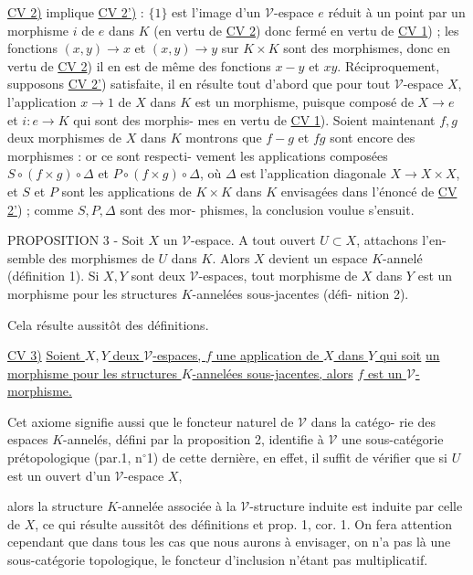 \underline{CV 2)} implique \underline{CV 2')} : $\{1\}$ est l'image d'un $\mathcal{V}$-espace $e$ réduit à
un point par un morphisme $i$ de $e$ dans $K$ (en vertu de \underline{CV 2}) donc fermé en
vertu de \underline{CV 1}) ; les fonctions $(x,y) \to x$ et $(x,y) \to y$ sur $K \times K$ sont des
morphismes, donc en vertu de \underline{CV 2}) il en est de même des fonctions $x-y$ et
$xy$. Réciproquement, supposons \underline{CV 2'}) satisfaite, il en résulte tout
d'abord que pour tout $\mathcal{V}$-espace $X$, l'application $x \to 1$ de $X$ dans $K$ est
un morphisme, puisque composé de $X \to e$ et $i : e \to K$ qui sont des morphis-
mes en vertu de \underline{CV 1}). Soient maintenant $f,g$ deux morphismes de $X$ dans $K$
montrons que $f-g$ et $f g$ sont encore des morphismes : or ce sont respecti-
vement les applications composées $S \circ (f \times g) \circ \Delta$ et $P \circ (f \times g) \circ \Delta$, où $\Delta$ est
l'application diagonale $X \to X \times X$, et $S$ et $P$ sont les applications de $K \times K$
dans $K$ envisagées dans l'énoncé de \underline{CV 2'}) ; comme $S, P, \Delta$ sont des mor-
phismes, la conclusion voulue s'ensuit.

PROPOSITION 3 - Soit $X$ un $\mathcal{V}$-espace. A tout ouvert $U \subset X$, attachons l'en-
semble des morphismes de $U$ dans $K$. Alors $X$ devient un espace $K$-annelé
(définition 1). Si $X,Y$ sont deux $\mathcal{V}$-espaces, tout morphisme de $X$ dans
$Y$ est un morphisme pour les structures $K$-annelées sous-jacentes (défi-
nition 2).

Cela résulte aussitôt des définitions.

\underline{CV 3)} \underline{Soient $X,Y$ deux $\mathcal{V}$-espaces, $f$ une application de $X$ dans $Y$ qui soit}
\underline{un morphisme pour les structures $K$-annelées sous-jacentes, alors}
\underline{$f$ est un $\mathcal{V}$-morphisme.}

Cet axiome signifie aussi que le foncteur naturel de $\mathcal{V}$ dans la catégo-
rie des espaces $K$-annelés, défini par la proposition 2, identifie à $\mathcal{V}$
une sous-catégorie prétopologique (par.1, n$^{\circ}$1) de cette dernière, en
effet, il suffit de vérifier que si $U$ est un ouvert d'un $\mathcal{V}$-espace $X$,

\newpage



alors la structure $K$-annelée associée à la $\mathcal{V}$-structure induite est
induite par celle de $X$, ce qui résulte aussitôt des définitions et
prop. 1, cor. 1. On fera attention cependant que dans tous les cas que
nous aurons à envisager, on n'a pas là une sous-catégorie topologique,
le foncteur d'inclusion n'étant pas multiplicatif.

